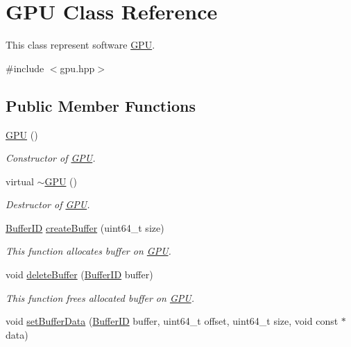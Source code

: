 \hypertarget{classGPU}{}\section{G\+PU Class Reference}
\label{classGPU}


This class represent software \hyperlink{classGPU}{G\+PU}.  




{\ttfamily \#include $<$gpu.\+hpp$>$}

\subsection*{Public Member Functions}
\begin{DoxyCompactItemize}
\item 
\hyperlink{group__gpu__init_ga2ca7973e32f63ba3472166a007419a75}{G\+PU} ()
\begin{DoxyCompactList}\small\item\em Constructor of \hyperlink{classGPU}{G\+PU}. \end{DoxyCompactList}\item 
virtual \hyperlink{group__gpu__init_gac4d153a08d3b9f40e5a8f1634f4a9e78}{$\sim$\+G\+PU} ()
\begin{DoxyCompactList}\small\item\em Destructor of \hyperlink{classGPU}{G\+PU}. \end{DoxyCompactList}\item 
\hyperlink{fwd_8hpp_a5114031b77b80ad895eff688720b7f93}{Buffer\+ID} \hyperlink{group__buffer__tasks_ga309724692e0d90a686642379f12d8d44}{create\+Buffer} (uint64\+\_\+t size)
\begin{DoxyCompactList}\small\item\em This function allocates buffer on \hyperlink{classGPU}{G\+PU}. \end{DoxyCompactList}\item 
void \hyperlink{group__buffer__tasks_ga05fb19b7c8b51a92162517aa7f25a166}{delete\+Buffer} (\hyperlink{fwd_8hpp_a5114031b77b80ad895eff688720b7f93}{Buffer\+ID} buffer)
\begin{DoxyCompactList}\small\item\em This function frees allocated buffer on \hyperlink{classGPU}{G\+PU}. \end{DoxyCompactList}\item 
void \hyperlink{group__buffer__tasks_ga97e1e76065fd913d6624b4c03164dcec}{set\+Buffer\+Data} (\hyperlink{fwd_8hpp_a5114031b77b80ad895eff688720b7f93}{Buffer\+ID} buffer, uint64\+\_\+t offset, uint64\+\_\+t size, void const $\ast$data)

\end{DoxyCompactItemize}
